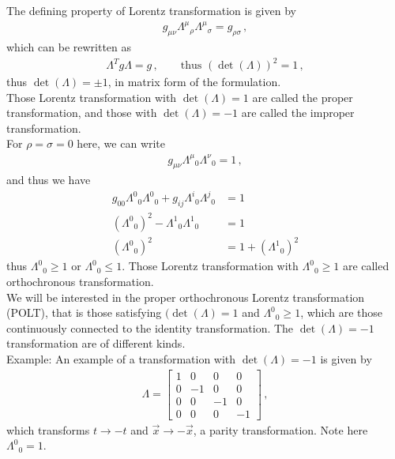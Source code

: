 \documentclass[11pt, onesided]{book}
\theoremstyle{break}
\theoremstyle{break}
\newcommand{\bmat}[1]{\begin{bmatrix} #1 \end{bmatrix}}
\newcommand{\example}{\color{green}Example: \color{black}}
\begin{document}
The defining property of Lorentz transformation is given by
\begin{align*}
g_{\mu\nu} \Lambda^\mu{}_{\rho}\Lambda^\mu{}_\sigma = g_{\rho \sigma}\,,
\end{align*}
which can be rewritten as
\begin{align*}
\Lambda^T g\Lambda = g\,, \qquad 
\text{thus }\left( \det(\Lambda)\right)^2 = 1\,,
\end{align*}
thus $\det(\Lambda) = \pm 1$, in matrix form of the formulation. \\

Those Lorentz transformation with $\det(\Lambda) = 1$ are called the proper transformation, and those with $\det(\Lambda) =-1$ are called the improper transformation. \\

For $\rho = \sigma = 0$ here, we can write
\begin{align*}
g_{\mu\nu}\Lambda^\mu{}_0 \Lambda^\nu{}_0 = 1\,,
\end{align*}
and thus we have
\begin{align*}
g_{00}\Lambda^0{}_0 \Lambda^0{}_0 + g_{ij}\Lambda^i{}_0 \Lambda^j{}_0 &= 1\\
(\Lambda^0{}_0)^2 - \Lambda^1{}_0 \Lambda^1{}_0 &= 1\\
( \Lambda^0{}_0)^2 &= 1 + ( \Lambda^1{}_0)^2
\end{align*}
thus $\Lambda^0{}_0 \geq 1$ or $\Lambda^0{}_0 \leq 1$. Those Lorentz transformation with $\Lambda^0{}_0 \geq 1$ are called orthochronous transformation.\\

We will be interested in the proper orthochronous Lorentz transformation (POLT), that is those satisfying $(\det(\Lambda) = 1$ and $\Lambda^0{}_0 \geq 1$, which are those continuously connected to the identity transformation. The $\det(\Lambda) = -1$ transformation are of different kinds.\\

\example An example of a transformation with $\det(\Lambda) = -1$ is given by
\begin{align*}
\Lambda = \bmat{1 & 0 & 0& 0\\
0 & -1 & 0 & 0 \\
0 & 0 & -1 & 0\\
0 & 0 & 0 & -1}\,,
\end{align*}
which transforms $t\to -t$ and $\vec{x} \to -\vec{x}$, a parity transformation. Note here $\Lambda^0{}_0 = 1$.\\
\end{document}
